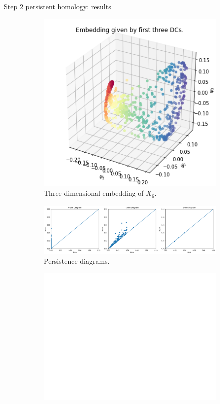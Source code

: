 \documentclass[xcolor={dvipsnames,svgnames}]{beamer}
\begin{document}
\begin{frame}{Step 2 persistent homology: results}
\begin{figure}[H]
\centering
\begin{subfigure}[b]{0.2\textwidth}
    \includegraphics[width=\textwidth]{figures/X6_embedding.png}
    \caption{Three-dimensional embedding of $X_6$.}
\end{subfigure}
\hfill
\begin{subfigure}[b]{0.75\textwidth}
    \includegraphics[width=\textwidth]{figures/X6_H0.png}
    \caption{Persistence diagrams.}
\end{subfigure}
\begin{subfigure}[b]{0.25\textwidth}
\includegraphics[width=\textwidth]{figures/white.png} 

\end{subfigure}
\end{figure}
\end{frame}
\end{document}
